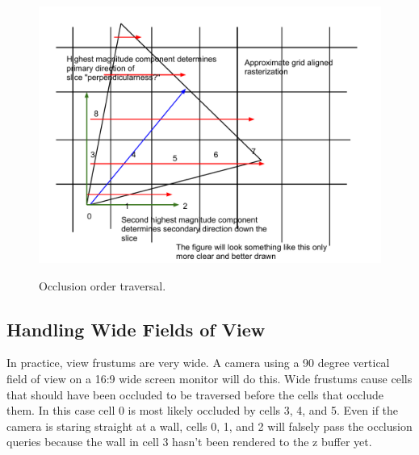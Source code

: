 \documentclass[12pt]{ucthesis}
\newcommand{\captionfonts}{\small\bf\ssp}
\begin{document}
\begin{figure}
\begin{center}
\includegraphics[width=\textwidth]{Images/frustum-iter.pdf}
\captionfonts
\caption[View Frustum Traversal]{Occlusion order traversal.}
\label{fig:frustum-iter}
\end{center}
\end{figure}

\subsection{Handling Wide Fields of View}
\label{handling-wide-fields-of-view}
In practice, view frustums are very wide.
A camera using a 90 degree vertical field of view on a 16:9 wide screen monitor will do this.
Wide frustums cause cells that should have been occluded to be traversed before the cells that occlude them.
In this case cell 0 is most likely occluded by cells 3, 4, and 5.
Even if the camera is staring straight at a wall, cells 0, 1, and 2 will falsely pass the occlusion queries because the wall in cell 3 hasn't been rendered to the z buffer yet.
\end{document}
